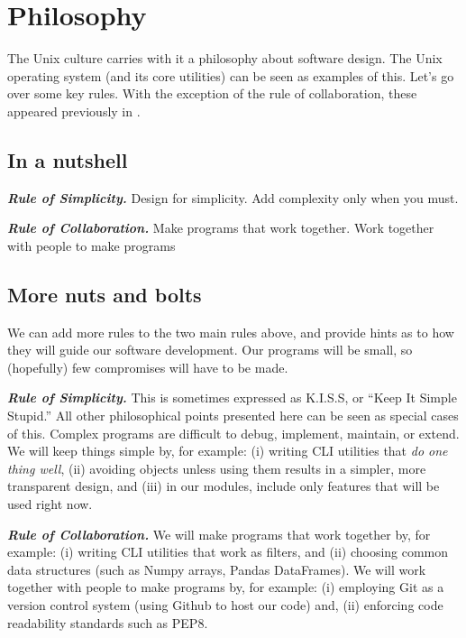 \section{Philosophy}
The Unix culture carries with it a philosophy about software design.  The Unix operating system (and its core utilities) can be seen as examples of this.    Let's go over some key rules.  With the exception of the rule of collaboration, these appeared previously in \cite{RaymondUnix}.

\subsection{In a nutshell}

\vspace{0.1in}
\noindent\textit{\textbf{Rule of Simplicity.}}
Design for simplicity.  Add complexity only when you must.

\vspace{0.1in}
\noindent\textit{\textbf{Rule of Collaboration.}}
Make programs that work together.  Work together with people to make programs

\subsection{More nuts and bolts}

We can add more rules to the two main rules above, and provide hints as to how they will guide our software development.  Our programs will be small, so (hopefully) few compromises will have to be made.

\textit{\textbf{Rule of Simplicity.}}
This is sometimes expressed as K.I.S.S, or ``Keep It Simple Stupid.''  All other philosophical points presented here can be seen as special cases of this.  Complex programs are difficult to debug, implement, maintain, or extend.  We will keep things simple by, for example:
(i) writing CLI utilities that \emph{do one thing well},
(ii) avoiding objects unless using them results in a simpler, more transparent design,
and
(iii) in our modules, include only features that will be used right now.

\textit{\textbf{Rule of Collaboration.}}
We will make programs that work together by, for example:
(i) writing CLI utilities that work as filters,
and
(ii) choosing common data structures (such as Numpy arrays, Pandas DataFrames).
We will work together with people to make programs by, for example:
(i) employing Git as a version control system (using Github to host our code)
and,
(ii) enforcing code readability standards such as PEP8.

